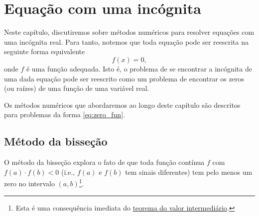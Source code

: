 
\chapter{Equação com uma incógnita}\label{cap_eq1d}
\thispagestyle{fancy}

Neste capítulo, discutiremos sobre métodos numéricos para resolver equações com uma incógnita real. Para tanto, notemos que toda equação pode ser reescrita na seguinte forma equivalente
\begin{equation}\label{eq:zero_fun}
  f(x) = 0,
\end{equation}
onde $f$ é uma função adequada. Isto é, o problema de se encontrar a incógnita de uma dada equação pode ser reescrito como um problema de encontrar os zeros (ou raízes) de uma função de uma variável real.

Os métodos numéricos que abordaremos ao longo deste capítulo são descritos para problemas da forma \eqref{eq:zero_fun}.

\section{Método da bisseção}\label{cap_eq1d_sec_bissec}

O método da bisseção explora o fato de que toda função contínua $f$ com $f(a)\cdot f(b) < 0$ (i.e., $f(a)$ e $f(b)$ tem sinais diferentes) tem pelo menos um zero no intervalo $(a, b)$\footnote{Esta é uma consequência imediata do \href{https://phkonzen.github.io/notas/AnaliseMatematicaI/cap_continuidade_sec_prop_f_cont.html}{teorema do valor intermediário}.}.

